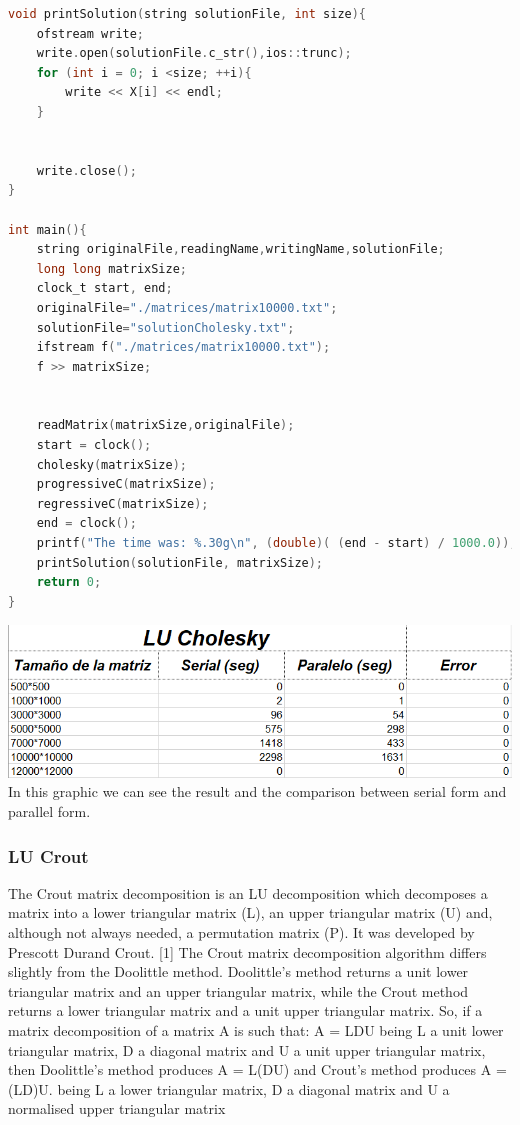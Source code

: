 \documentclass{article}
\newcounter{subsubsubsection}[subsubsection]
\begin{document}
\begin{lstlisting}[language=C]
void printSolution(string solutionFile, int size){
    ofstream write;
    write.open(solutionFile.c_str(),ios::trunc);
    for (int i = 0; i <size; ++i){
        write << X[i] << endl;
    }
    

    write.close();
}

int main(){
	string originalFile,readingName,writingName,solutionFile;
    long long matrixSize;
    clock_t start, end;
    originalFile="./matrices/matrix10000.txt";
    solutionFile="solutionCholesky.txt";
    ifstream f("./matrices/matrix10000.txt");
    f >> matrixSize; 


    readMatrix(matrixSize,originalFile);
    start = clock();
    cholesky(matrixSize);
    progressiveC(matrixSize);
    regressiveC(matrixSize);
    end = clock(); 
    printf("The time was: %.30g\n", (double)( (end - start) / 1000.0)); 
    printSolution(solutionFile, matrixSize);
	return 0;
}
\end{lstlisting}



\includegraphics[width=\linewidth]{./images/cholesky.png}\\
In this graphic we can see the result and the comparison between serial form and parallel form.

\newpage

\subsubsection{LU Crout}


The Crout matrix decomposition is an LU decomposition which decomposes a matrix into a lower triangular matrix (L), an upper triangular matrix (U) and, although not always needed, a permutation matrix (P). It was developed by Prescott Durand Crout. [1]
The Crout matrix decomposition algorithm differs slightly from the Doolittle method. Doolittle's method returns a unit lower triangular matrix and an upper triangular matrix, while the Crout method returns a lower triangular matrix and a unit upper triangular matrix.
So, if a matrix decomposition of a matrix A is such that:
A = LDU
being L a unit lower triangular matrix, D a diagonal matrix and U a unit upper triangular matrix, then Doolittle's method produces
A = L(DU)
and Crout's method produces
A = (LD)U.
being L a lower triangular matrix, D a diagonal matrix and U a normalised upper triangular matrix
\end{document}
